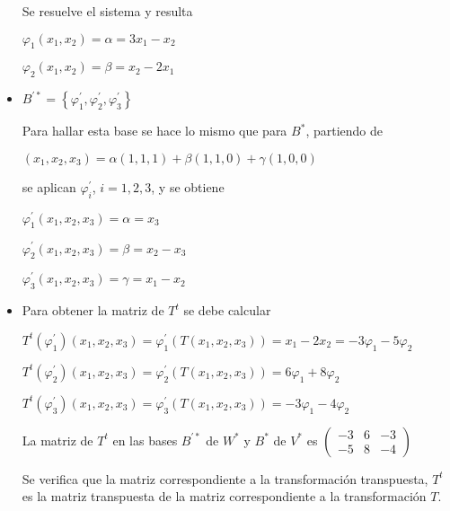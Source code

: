 \begin{example}
\begin{itemize}
Se resuelve el sistema y resulta 

\bigskip

$\varphi_1(x_1, x_2)= \alpha=3x_1 -x_2$

\bigskip

 $\varphi_2(x_1, x_2)= \beta =x_2 -2 x_1$
 
\bigskip

 \item
 $B^{\prime *}=\left\{ \varphi^{\prime}_1, \varphi^{\prime}_2, \varphi^{\prime}_3 \right\}$ 


\bigskip

Para hallar esta base  se hace lo mismo que para  $B^*$, partiendo de 

\bigskip

$(x_1, x_2,x_3)= \alpha (1,1,1)+   \beta (1,1,0)+  \gamma (1,0,0)$

\bigskip


se aplican $\varphi^{\prime}_i$, $i=1,2,3$, y se obtiene 


\bigskip

$\varphi^{\prime}_1(x_1, x_2,x_3)= \alpha=x_3$

 \bigskip
 
$\varphi^{\prime}_2(x_1, x_2,x_3)= \beta=x_2-x_3$

 \bigskip
 
$\varphi^{\prime}_3(x_1, x_2,x_3)= \gamma=x_1-x_2$

 \bigskip
 
 \item
 
Para obtener  la matriz de $ T^t$ se debe calcular

\bigskip

$ T^t ( \varphi^{\prime}_1)(x_1, x_2,x_3)   = \varphi^{\prime}_1(T(x_1, x_2,x_3)) = x_1-2x_2= -3 \varphi_1 - 5 \varphi_2 $


\bigskip

$ T^t ( \varphi^{\prime}_2)(x_1, x_2,x_3)   = \varphi^{\prime}_2(T(x_1, x_2,x_3)) =  6 \varphi_1 + 8 \varphi_2 $ 


 \bigskip

$ T^t ( \varphi^{\prime}_3)(x_1, x_2,x_3)   = \varphi^{\prime}_3(T(x_1, x_2,x_3)) =  -3 \varphi_1 -4 \varphi_2 $ 


\bigskip

La matriz de $T^t$ en las bases  $B^{\prime *}$  de $W^*$  y $B^*$  de $V^*$ es 
$\left(\begin{array}{ccc}  -3 & 6   & -3\\ -5 &  8 & -4
\end{array}
 \right)$


\bigskip

Se verifica que la matriz correspondiente a la transformación transpuesta,  $ T^t$ es la matriz transpuesta de la matriz correspondiente a la transformación $T$.

\end{itemize}
\end{example}


